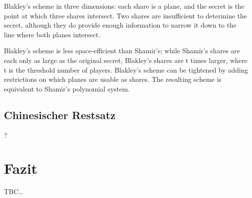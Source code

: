 \documentclass[12pt, a4paper, oneside, titlepage]{report}
\theoremstyle{definition}
\begin{document}
		Blakley's scheme in three dimensions: each share is a plane, and the secret is the point at which three shares intersect. Two shares are insufficient to determine the secret, although they do provide enough information to narrow it down to the line where both planes intersect.
		
		Blakley's scheme is less space-efficient than Shamir's; while Shamir's shares are each only as large as the original secret, Blakley's shares are t times larger, where t is the threshold number of players. Blakley's scheme can be tightened by adding restrictions on which planes are usable as shares. The resulting scheme is equivalent to Shamir's polynomial system.
	\subsection{Chinesischer Restsatz}
	?%
	\section{Fazit}
	TBC\dots %
	\cleardoublepage
	\listoffigures
	\begingroup
	\let\clearpage\relax
	
	\endgroup
\end{document}
